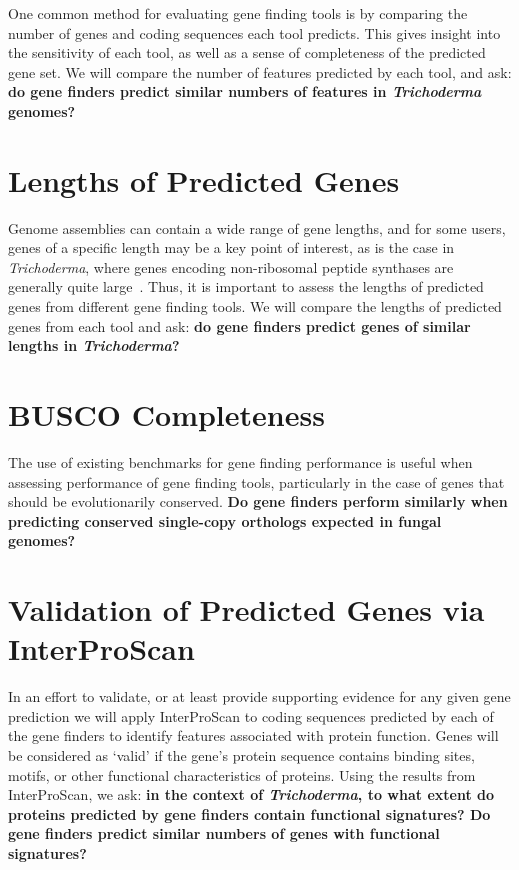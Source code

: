 One common method for evaluating gene finding tools is by comparing the number of genes and coding sequences each tool predicts. This gives insight into the sensitivity of each tool, as well as a sense of completeness of the predicted gene set. We will compare the number of features predicted by each tool, and ask: \textbf{do gene finders predict similar numbers of features in \textit{Trichoderma} genomes?}

\section{Lengths of Predicted Genes}
\label{rq:gene-lengths}
Genome assemblies can contain a wide range of gene lengths, and for some
users, genes of a specific length may be a key point of interest, as is the case in \textit{Trichoderma}, where genes encoding non-ribosomal peptide synthases are generally quite large~\cite{komaki2020}. Thus, it is important to assess the lengths of predicted genes from different gene finding tools. We will compare the lengths of predicted genes from each tool and ask: \textbf{do gene finders predict genes of similar lengths in \textit{Trichoderma}?}

\section{BUSCO Completeness}
\label{rq:busco-completeness}
The use of existing benchmarks for gene finding performance is useful
when assessing performance of gene finding tools, particularly in the
case of genes that should be evolutionarily conserved. \textbf{Do gene
  finders perform similarly when predicting conserved single-copy orthologs expected in fungal
  genomes?}

\section{Validation of Predicted Genes via InterProScan}
\label{rq:interproscan}
In an effort to validate, or at least provide supporting evidence for
any given gene prediction we will apply InterProScan to coding
sequences predicted by each of the gene finders to identify features
associated with protein function. Genes will be considered as `valid'
if the gene's protein sequence contains binding sites, motifs, or
other functional characteristics of proteins. Using the results from
InterProScan, we ask: \textbf{in the context of
  \textit{Trichoderma}, to what extent do proteins predicted by gene finders contain
  functional signatures? Do gene finders predict similar numbers of genes with functional signatures?}

